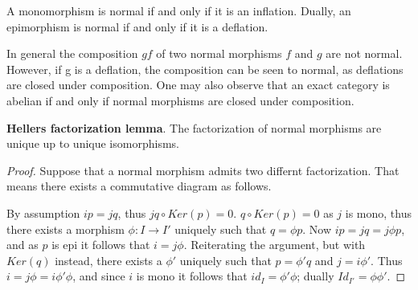     \begin{remark}
        A monomorphism is normal if and only if it is an inflation. Dually, an epimorphism is normal if and only if it is a deflation.
    \end{remark}

    \begin{remark}
        In general the composition $gf$ of two normal morphisms $f$ and $g$ are not normal. However, if g is a deflation, the composition can be seen to normal, as deflations are closed under composition. One may also observe that an exact category is abelian if and only if normal morphisms are closed under composition.
    \end{remark}

    \begin{lemma}
        \textbf{Hellers factorization lemma}. The factorization of normal morphisms are unique up to unique isomorphisms.
    \end{lemma}

    \begin{proof}
        Suppose that a normal morphism admits two differnt factorization. That means there exists a commutative diagram as follows.
        \begin{center}
        \end{center}
        By assumption $ip=jq$, thus $jq\circ Ker(p)=0$. $q\circ Ker(p)=0$ as $j$ is mono, thus there exists a morphism $\phi:I\rightarrow I'$ uniquely such that $q=\phi p$. Now $ip=jq=j\phi p$, and as $p$ is epi it follows that $i=j\phi$.  Reiterating the argument, but with $Ker(q)$ instead, there exists a $\phi '$ uniquely such that $p = \phi 'q$ and $j=i\phi '$. Thus $i=j\phi = i\phi '\phi$, and since $i$ is mono it follows that $id_I=\phi '\phi$; dually $Id_{I'}=\phi\phi '$.
    \end{proof}

